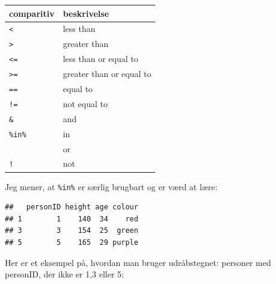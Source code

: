 \documentclass[
]{book}
\newenvironment{Shaded}{\begin{snugshade}}{\end{snugshade}}
\newcommand{\CommentTok}[1]{\textcolor[rgb]{0.56,0.35,0.01}{\textit{#1}}}
\newcommand{\DecValTok}[1]{\textcolor[rgb]{0.00,0.00,0.81}{#1}}
\newcommand{\FunctionTok}[1]{\textcolor[rgb]{0.00,0.00,0.00}{#1}}
\newcommand{\NormalTok}[1]{#1}
\newcommand{\SpecialCharTok}[1]{\textcolor[rgb]{0.00,0.00,0.00}{#1}}
\begin{document}
\begin{longtable}[]{@{}ll@{}}
\toprule
comparitiv & beskrivelse \\
\midrule
\endhead
\texttt{\textless{}} & less than \\
\texttt{\textgreater{}} & greater than \\
\texttt{\textless{}=} & less than or equal to \\
\texttt{\textgreater{}=} & greater than or equal to \\
\texttt{==} & equal to \\
\texttt{!=} & not equal to \\
\texttt{\&} & and \\
\texttt{\%in\%} & in \\
\texttt{\textbar{}} & or \\
\texttt{!} & not \\
\bottomrule
\end{longtable}

Jeg mener, at \texttt{\%in\%} er særlig brugbart og er værd at lære:

\begin{Shaded}
\end{Shaded}

\begin{verbatim}
##   personID height age colour
## 1        1    140  34    red
## 3        3    154  25  green
## 5        5    165  29 purple
\end{verbatim}

Her er et eksempel på, hvordan man bruger udråbstegnet: personer med personID, der ikke er 1,3 eller 5:

\begin{Shaded}
\end{Shaded}
\end{document}
